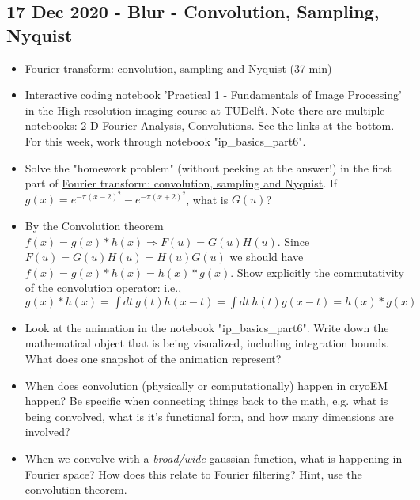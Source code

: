 \documentclass[11pt, oneside]{article}   	%
\begin{document}
\subsection{17 Dec 2020 - Blur - Convolution, Sampling, Nyquist}
\begin{itemize}
	\item \href{https://youtu.be/_F-YDwY9X30}{Fourier transform: convolution, sampling and Nyquist} (37 min)
	\item Interactive coding notebook \href{https://gitlab.tudelft.nl/aj-lab/teaching/-/wikis/NB4020}{'Practical 1 - Fundamentals of Image Processing'} in the High-resolution imaging course at TUDelft. Note there are multiple notebooks: 2-D Fourier Analysis, Convolutions. See the links at the bottom. For this week, work through notebook "ip\_basics\_part6".
\end{itemize}
\begin{itemize}
	\item Solve the "homework problem" (without peeking at the answer!) in the first part of \href{https://youtu.be/_F-YDwY9X30}{Fourier transform: convolution, sampling and Nyquist}. If $g(x) = e^{-\pi(x-2)^2} - e^{-\pi(x+2)^2}$, what is $G(u)$?
	\item By the Convolution theorem $f(x)=g(x)*h(x) \Rightarrow F(u)=G(u)H(u)$. Since $F(u)=G(u)H(u)=H(u)G(u)$ we should have $f(x)=g(x)*h(x)=h(x)*g(x)$. Show explicitly the commutativity of the convolution operator: i.e., $g(x)*h(x)=\int dt \ g(t)h(x-t)=\int dt \ h(t)g(x-t)=h(x)*g(x)$
	\item Look at the animation in the notebook "ip\_basics\_part6". Write down the mathematical object that is being visualized, including integration bounds. What does one snapshot of the animation represent?
	\item When does convolution (physically or computationally) happen in cryoEM happen? Be specific when connecting things back to the math, e.g. what is being convolved, what is it's functional form, and how many dimensions are involved?
	\item When we convolve with a {\it broad/wide} gaussian function, what is happening in Fourier space? How does this relate to Fourier filtering? Hint, use the convolution theorem.
\end{itemize}
\end{document}
